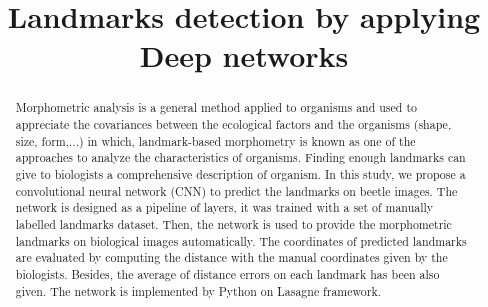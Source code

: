 \documentclass[conference]{IEEEtran}
\begin{document}
\title{Landmarks detection by applying Deep networks}


\maketitle

\begin{abstract}
Morphometric analysis is a general method applied to organisms and used to appreciate the covariances between the ecological factors and the organisms (shape, size, form,...) in which, landmark-based morphometry is known as one of the approaches to analyze the characteristics of organisms. Finding enough landmarks can give to biologists a comprehensive description of organism. In this study, we propose a convolutional neural network (CNN) to predict the landmarks on beetle images. The network is designed as a pipeline of layers, it was trained with a set of manually labelled landmarks dataset. Then, the network is used to provide the morphometric landmarks on biological images automatically. The coordinates of predicted landmarks are evaluated by computing the distance with the manual coordinates given by the biologists. Besides, the average of distance errors on each
landmark has been also given. The network is implemented by Python on Lasagne framework.
\end{abstract}
\end{document}
